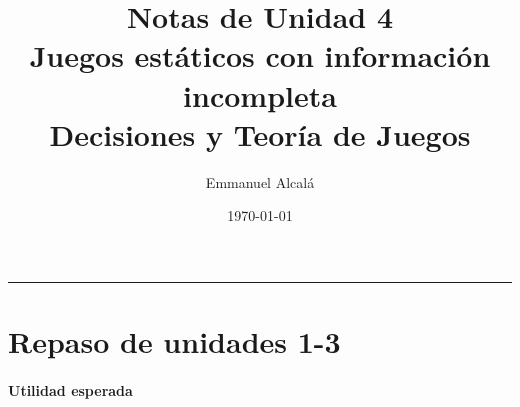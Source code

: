 \documentclass[12pt]{article}
\title{\sffamily Notas de Unidad 4\\ \textbf{Juegos estáticos con información incompleta}\\ \normalsize Decisiones y Teoría de Juegos}
\author{Emmanuel Alcalá}
\date{\today}
\begin{document}
\maketitle

\hrule



\section*{Repaso de unidades 1-3}

\paragraph{Utilidad esperada}
\end{document}

